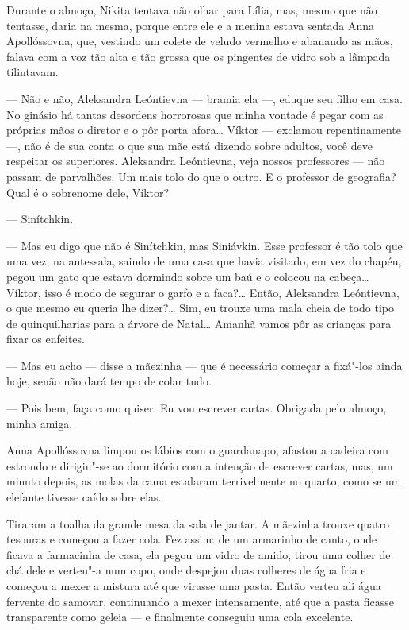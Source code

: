 Durante o almoço, Nikita tentava não olhar para Lília, mas, mesmo que
não tentasse, daria na mesma, porque entre ele e a menina estava sentada
Anna Apollóssovna, que, vestindo um colete de veludo vermelho e abanando
as mãos, falava com a voz tão alta e tão grossa que os pingentes de
vidro sob a lâmpada tilintavam.

--- Não e não, Aleksandra Leóntievna --- bramia ela ---, eduque seu
filho em casa. No ginásio há tantas desordens horrorosas que minha
vontade é pegar com as próprias mãos o diretor e o pôr porta afora\ldots{}
Víktor --- exclamou repentinamente ---, não é de sua conta o que sua mãe
está dizendo sobre adultos, você deve respeitar os superiores.
Aleksandra Leóntievna, veja nossos professores --- não passam de
parvalhões. Um mais tolo do que o outro. E o professor de geografia?
Qual é o sobrenome dele, Víktor?

--- Sinítchkin.

--- Mas eu digo que não é Sinítchkin, mas Siniávkin. Esse professor é
tão tolo que uma vez, na antessala, saindo de uma casa que havia
visitado, em vez do chapéu, pegou um gato que estava dormindo sobre um
baú e o colocou na cabeça\ldots{} Víktor, isso é modo de segurar o garfo e a
faca?\ldots{} Então, Aleksandra Leóntievna, o que mesmo eu queria lhe
dizer?\ldots{} Sim, eu trouxe uma mala cheia de todo tipo de quinquilharias
para a árvore de Natal\ldots{} Amanhã vamos pôr as crianças para fixar os
enfeites.

--- Mas eu acho --- disse a mãezinha --- que é necessário começar a
fixá"-los ainda hoje, senão não dará tempo de colar tudo.

--- Pois bem, faça como quiser. Eu vou escrever cartas. Obrigada pelo
almoço, minha amiga.

Anna Apollóssovna limpou os lábios com o guardanapo, afastou a cadeira
com estrondo e dirigiu"-se ao dormitório com a intenção de escrever
cartas, mas, um minuto depois, as molas da cama estalaram terrivelmente
no quarto, como se um elefante tivesse caído sobre elas.

Tiraram a toalha da grande mesa da sala de jantar. A mãezinha trouxe
quatro tesouras e começou a fazer cola. Fez assim: de um armarinho de
canto, onde ficava a farmacinha de casa, ela pegou um vidro de amido,
tirou uma colher de chá dele e verteu"-a num copo, onde despejou duas
colheres de água fria e começou a mexer a mistura até que virasse uma
pasta. Então verteu ali água fervente do samovar, continuando a mexer
intensamente, até que a pasta ficasse transparente como geleia --- e
finalmente conseguiu uma cola excelente.

